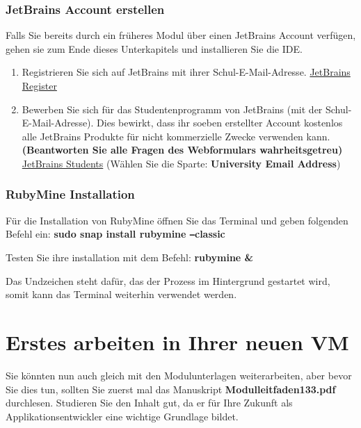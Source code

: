 \subsubsection{JetBrains Account erstellen}\label{subsubsec:jetbrainsAccount}
\begin{frame}[fragile]
    Falls Sie bereits durch ein früheres Modul über einen JetBrains Account verfügen, gehen sie zum Ende dieses
    Unterkapitels und installieren Sie die IDE.
    \begin{enumerate}
        \item Registrieren Sie sich auf JetBrains mit ihrer Schul-E-Mail-Adresse.
        \href{https://account.jetbrains.com/login}{JetBrains Register}
        \item Bewerben Sie sich für das Studentenprogramm von JetBrains (mit der Schul-E-Mail-Adresse).
        Dies bewirkt, dass ihr soeben erstellter Account kostenlos alle JetBrains Produkte für nicht kommerzielle Zwecke verwenden kann.
        \textbf{(Beantworten Sie alle Fragen des Webformulars wahrheitsgetreu)}
        \href{https://www.jetbrains.com/shop/eform/students}{JetBrains Students}
        (Wählen Sie die Sparte: \textbf{University Email Address})
    \end{enumerate}
\end{frame}

\subsubsection{RubyMine Installation}\label{subsubsec:RubyMine}
\begin{frame}[fragile]
    Für die Installation von RubyMine öffnen Sie das Terminal und geben folgenden Befehl ein:\newline
    \textbf{sudo snap install rubymine \texttt{--}classic}

    Testen Sie ihre installation mit dem Befehl: \textbf{rubymine \&}

    Das Undzeichen steht dafür, das der Prozess im Hintergrund gestartet wird, somit kann das Terminal weiterhin verwendet werden.
\end{frame}

\newpage


\section{Erstes arbeiten in Ihrer neuen VM}\label{sec:erstesarbeiten}
\begin{frame}[fragile]
    Sie könnten nun auch gleich mit den Modulunterlagen weiterarbeiten, aber bevor Sie dies tun, sollten Sie zuerst mal
    das Manuskript \textbf{Modulleitfaden\textunderscore 133.pdf} durchlesen.
    Studieren Sie den Inhalt gut, da er für Ihre Zukunft als Applikationsentwickler eine wichtige Grundlage bildet.
\end{frame}

